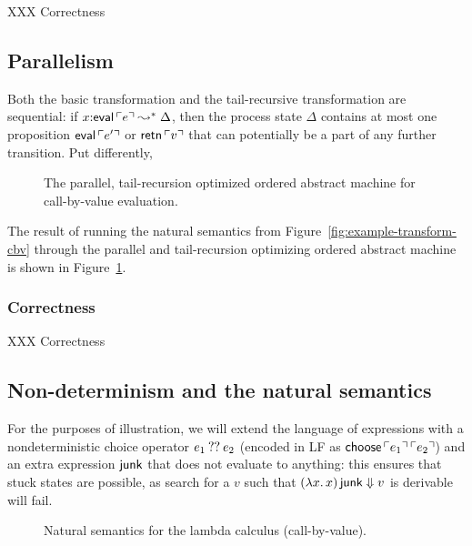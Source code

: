 XXX Correctness

\subsection{Parallelism}
\label{sec:trans-par}

Both the basic transformation and the tail-recursive transformation
are sequential: if $x{:}{\sf eval}\,{\ulcorner{e}\urcorner} \leadsto^* \Delta$,
then the process state $\Delta$ contains at most one proposition ${\sf
  eval}\,{\ulcorner{e'}\urcorner}$ or ${\sf retn}\,{\ulcorner{v}\urcorner}$ that can potentially
be a part of any further transition. Put differently,

\begin{figure}
\caption{The parallel, tail-recursion optimized ordered abstract machine for
 call-by-value evaluation.}
\label{fig:cbv-ev-ssos-par}
\end{figure}

The result of running the natural semantics from
Figure~\ref{fig:example-transform-cbv} through the parallel and
tail-recursion optimizing ordered abstract machine is shown in
Figure~\ref{fig:cbv-ev-ssos-par}.

\subsubsection{Correctness}

XXX Correctness

\subsection{Non-determinism and the natural semantics}

For the purposes of illustration, we will extend the language of
expressions with a nondeterministic choice operator $e_1 \mathbin{??} e_2$
(encoded in LF as ${\sf choose}\,{\ulcorner{e_1}\urcorner}\,{\ulcorner{e_2}\urcorner}$) and an
extra expression ${\sf junk}$ that does not evaluate to anything: this
ensures that stuck states are possible, as search for a $v$ such that
$(\lambda x.\,x)\,{\sf junk} \Downarrow v$ is derivable will fail.

\begin{figure}[t]
\begin{minipage}[b]{0.45\linewidth}
\end{minipage}
\hspace{0.5cm}
\begin{minipage}[b]{0.55\linewidth}
\end{minipage}
\caption{Natural semantics for the lambda calculus (call-by-value).}
\label{fig:ns-arb}
\end{figure}

